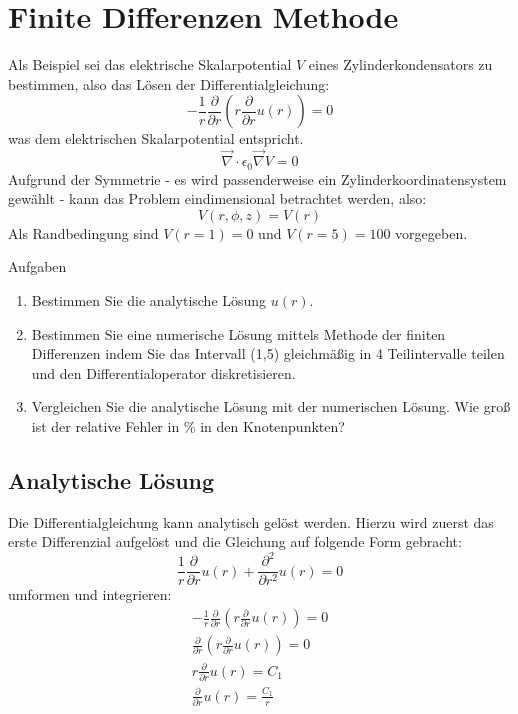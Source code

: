 \section{Finite Differenzen Methode}
	Als Beispiel sei das elektrische Skalarpotential $V$ eines Zylinderkondensators zu bestimmen, also das Lösen der Differentialgleichung:
	\begin{equation}
	-\frac{1}{r} \frac{\partial}{\partial r} ( r \frac{\partial }{\partial r} u(r)) = 0
	\end{equation}
	was dem elektrischen Skalarpotential entspricht.
	\begin{equation}
		\vec \nabla \cdot \epsilon_0 \vec \nabla V = 0
		\label{e-potential}
	\end{equation}
	Aufgrund der Symmetrie - es wird passenderweise ein Zylinderkoordinatensystem gewählt - kann das Problem eindimensional betrachtet werden, also:
	\begin{equation}
	V(r,\phi, z) = V(r)
	\end{equation}
	Als Randbedingung sind $V(r=1)=0$ und $V(r=5)=100$ vorgegeben. 
	\\
	
	{\Large Aufgaben \par}
	\begin{enumerate}
		\item Bestimmen Sie die analytische Lösung $u(r)$.
		\item Bestimmen Sie eine numerische Lösung mittels Methode der finiten Differenzen indem Sie das Intervall (1,5) gleichmäßig in 4 Teilintervalle teilen und den Differentialoperator diskretisieren.
		\item  Vergleichen Sie die analytische Lösung mit der numerischen Lösung. Wie groß ist der relative Fehler in \% in den Knotenpunkten?
	\end{enumerate}
	
	
	\subsection{Analytische Lösung}
	Die Differentialgleichung kann analytisch gelöst werden. Hierzu wird zuerst das erste Differenzial aufgelöst und die Gleichung auf folgende Form gebracht:
	\begin{equation}
	\frac{1}{r} \frac{\partial }{\partial r} u(r) +  \frac{\partial^2}{\partial r^2} u(r) = 0
	\end{equation}
	umformen und integrieren:
	\begin{eqnarray}
		-\frac{1}{r} \frac{\partial}{\partial r} ( r \frac{\partial }{\partial r} u(r)) = 0 \\
		 \frac{\partial}{\partial r} ( r \frac{\partial }{\partial r} u(r)) = 0 \\
		  r \frac{\partial }{\partial r} u(r) = C_1 \\
		  \frac{\partial }{\partial r} u(r) = \frac{C_1}{r} \\
	\end{eqnarray}
	
